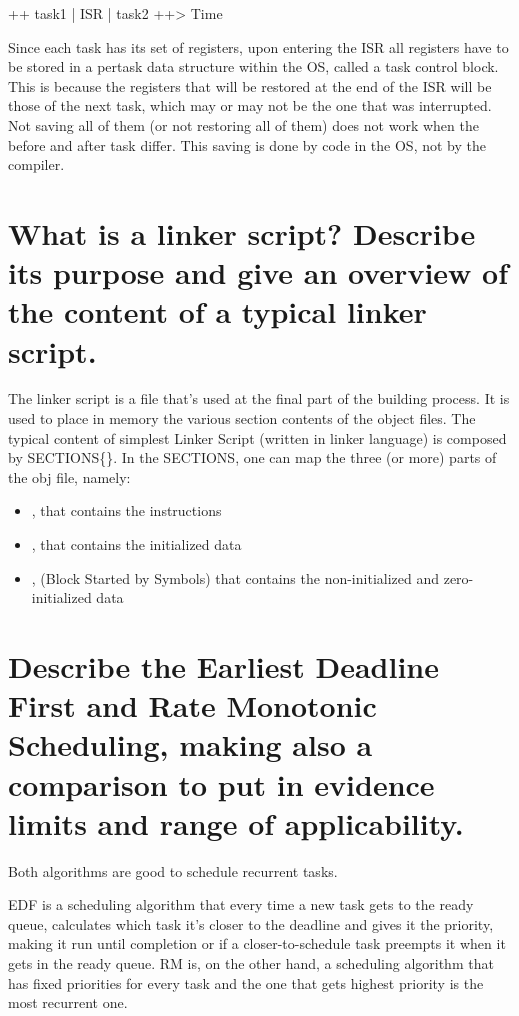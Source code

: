 ++ task1 | ISR | task2 ++> Time


Since each task has its set of registers, upon entering the ISR all registers have to be stored in a per­task data structure within the OS, called a task control block. This is because the registers that will be restored at the end of the ISR will be those of the next task, which may or may not be the one that was interrupted. Not saving all of them (or not restoring all of them) does not work when the before and after task differ. This saving is done by code in the OS, not by the compiler.

\section{What is a linker script? Describe its purpose and give an overview of the content of a typical linker script.}
The linker script is a file that's used at the final part of the building process. It is used to place in memory the various section contents of the object files. 
The typical content of simplest Linker Script (written in linker language) is composed by SECTIONS\{\}.
In the SECTIONS, one can map the three (or more) parts of the obj file, namely:
\begin{itemize}
	\item {}, that contains the instructions
	\item {}, that contains the initialized data
	\item {}, (Block Started by Symbols) that contains the non-initialized and zero-initialized data
\end{itemize}


\section{Describe the Earliest Deadline First and Rate Monotonic Scheduling, making also a comparison to put in evidence limits and range of applicability.}

Both algorithms are good to schedule recurrent tasks.

EDF is a scheduling algorithm that every time a new task gets to the ready queue, calculates which task it's closer to the deadline and gives it the priority, making it run until completion or if a closer-to-schedule task preempts it when it gets in the ready queue. 
RM is, on the other hand, a scheduling algorithm that has fixed priorities for every task and the one that gets highest priority is the most recurrent one.

